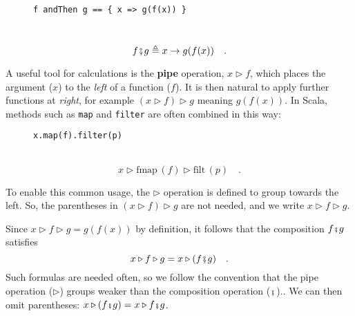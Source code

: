 \begin{wrapfigure}{l}{0.5\columnwidth}%
\vspace{-0.65\baselineskip}
\begin{lstlisting}
f andThen g == { x => g(f(x)) }
\end{lstlisting}

\vspace{-0.25\baselineskip}
\end{wrapfigure}%

~\vspace{-0.35\baselineskip}
\[
f\bef g\triangleq x\rightarrow g(f(x))\quad.
\]
\vspace{-0.85\baselineskip}

A useful tool for calculations is the \textbf{pipe}
operation, $x\triangleright f$, which places the argument ($x$)
to the \emph{left} of a function ($f$). It is then natural to apply
further functions at \emph{right}, for example $(x\triangleright f)\triangleright g$
meaning $g(f(x))$. In Scala, methods such as \lstinline!map! and
\lstinline!filter! are often combined in this way:

\begin{wrapfigure}{l}{0.5\columnwidth}%
\vspace{-0.65\baselineskip}
\begin{lstlisting}
x.map(f).filter(p)
\end{lstlisting}

\vspace{-0.25\baselineskip}
\end{wrapfigure}%

~\vspace{-0.35\baselineskip}
\[
x\triangleright\text{fmap}\,(f)\triangleright\text{filt}\,(p)\quad.
\]
\vspace{-0.85\baselineskip}

To enable this common usage, the $\triangleright$ operation is defined
to group towards the left. So, the parentheses in $(x\triangleright f)\triangleright g$
are not needed, and we write $x\triangleright f\triangleright g$.

Since $x\triangleright f\triangleright g=g(f(x))$ by definition,
it follows that the composition $f\bef g$ satisfies
\[
x\triangleright f\triangleright g=x\triangleright(f\bef g)\quad.
\]
Such formulas are needed often, so we follow the convention that the
pipe operation ($\triangleright$) groups weaker than the composition
operation ($\bef$).. We
can then omit parentheses: $x\triangleright(f\bef g)=x\triangleright f\bef g$. 

